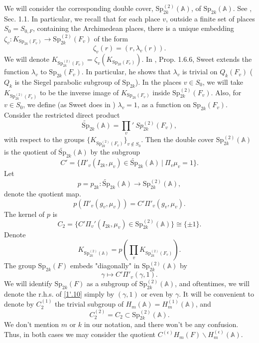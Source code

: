 \documentclass[12pts]{amsart}
\newcommand{\BA}{{\mathbb {A}}}
\newcommand{\Sp}{{\mathrm{Sp}}}
\begin{document}
We will consider the corresponding double cover, $\Sp^{(2)}_{2k}(\BA)$, of $\Sp_{2k}(\BA)$. See \cite{GS18}, Sec. 1.1. In particular, we recall that for each place $v$, outside a finite set of places $S_0=S_{0,F}$, containing the Archimedean places, there is a unique embedding 
$\zeta_v: K_{\Sp_{2k}(F_v)}\rightarrow \Sp^{(2)}_{2k}(F_v)$ of the form 
\begin{equation}\label{1'.3}
\zeta_v(r)=(r,\lambda_v(r)). 
\end{equation}
We will denote  $K_{\Sp^{(2)}_{2k}(F_v)}=\zeta_v(K_{\Sp_{2k}(F_v)})$. In \cite{Sw90}, Prop. 1.6.6, Sweet extends the function $\lambda_v$ to $\Sp_{2k}(F_v)$. In particular, he shows that $\lambda_v$ is trivial on $Q_k(F_v)$ ($Q_k$ is the Siegel parabolic subgroup of $\Sp_{2k}$). In the places $v\in S_0$, we will take $K_{\Sp^{(2)}_{2k}(F_v)}$ to be the inverse image of $K_{\Sp_{2k}(F_v)}$ inside $\Sp^{(2)}_{2k}(F_v)$. Also, for $v\in S_0$, we define (as Sweet does in \cite{Sw90}) $\lambda_v=1$, as a function on $\Sp_{2k}(F_v)$.  
Consider the restricted direct product 
\begin{equation}\label{1'.4}
\widetilde{\Sp}_{2k}(\BA)=\prod_v{}'\ Sp^{(2)}_{2k}(F_v),
\end{equation}
with respect to the groups $\{K_{\Sp^{(2)}_{2k}(F_v)}\}_{v\notin S_0}$. Then the double cover $\Sp^{(2)}_{2k}(\BA)$ is the quotient of $\widetilde{\Sp}_{2k}(\BA)$ by the subgroup 
\begin{equation}\label{1'.5}
C'=\{\Pi'_v(I_{2k},\mu_v)\in \widetilde{\Sp}_{2k}(\BA) \ |\ \Pi_v\mu_v=1\}.
\end{equation}
Let 
\begin{equation}\label{1'.6}
p=p_{2k}:\widetilde{\Sp}_{2k}(\BA)\rightarrow \Sp^{(2)}_{2k}(\BA),
\end{equation}
denote the quotient map. 
\begin{equation}\label{1'.7}
p(\Pi'_v(g_v,\mu_v))=C'\Pi'_v(g_v,\mu_v).
\end{equation}
The kernel of $p$ is
\begin{equation}\label{1'.8}
C_2=\{C'\Pi_v'(I_{2k},\mu_v)\in \Sp^{(2)}_{2k}(\BA)\}\cong \{\pm 1\}.
\end{equation}
Denote 
\begin{equation}\label{1'.9}
K_{\Sp^{(2)}_{2k}(\BA)}=p(\prod_v K_{\Sp^{(2)}_{2k}(F_v)}).
\end{equation}
The group $\Sp_{2k}(F)$ embeds "diagonally" in $\Sp^{(2)}_{2k}(\BA)$ by
\begin{equation}\label{1'.10}
\gamma\mapsto C'\Pi'_v(\gamma,1).
\end{equation}
We will identify $\Sp_{2k}(F)$ as a subgroup of $\Sp^{(2)}_{2k}(\BA)$, and oftentimes, we will denote the r.h.s. of \eqref{1'.10} simply by $(\gamma,1)$ or even by $\gamma$. It will be convenient to denote by $C^{(1)}_2$ the trivial subgroup of $H_m(\BA)=H_m^{(1)}(\BA)$, and
\begin{equation}\label{1'.11}
C_2^{(2)}=C_2\subset \Sp^{(2)}_{2k}(\BA).
\end{equation}
We don't mention $m$ or $k$ in our notation, and there won't be any confusion. Thus, in both cases we may consider the quotient $C^{(\epsilon)}H_m(F)\backslash H_m^{(\epsilon)}(\BA)$.
\end{document}
